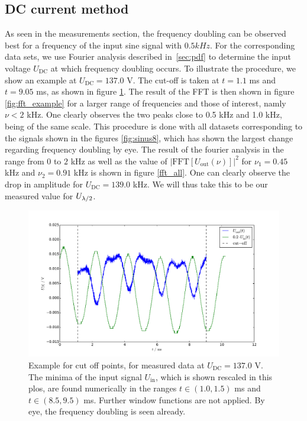 \subsection{DC current method}
\label{ssub:DC current method}
As seen in the measurements section, the frequency doubling can be 
observed best for a frequency of the input sine signal with 
$0.5 kHz$. For the corresponding data sets, we use Fourier analysis 
described in~\ref{sec:pdf} to determine 
the input voltage $U_\mathrm{DC}$ at which frequency doubling occurs. 
To illustrate the procedure, we show an example at $U_\mathrm{DC} = 137.0$ V.
The cut-off is taken at $t = 1.1$ ms and $t = 9.05$ ms, as shown in figure 
\ref{fig:cut_off_example}. The result of the FFT is then shown in figure 
\ref{fig:fft_example} for a larger range of frequencies and those of interest, 
namly $\nu < 2$ kHz. One clearly observes the two peaks close to 
0.5 kHz and 1.0 kHz, being of the same scale. This procedure is 
done with all datasets corresponding to the signals shown in 
the figures \ref{fig:sinus8}, which has shown the largest 
change regarding frequency doubling by eye. The result of the fourier 
analysis in the range from $0$ to $2$ kHz as well as the 
value of $|\mathrm{FFT}\left[U_\mathrm{out} \left(\nu\right)\right]|^2$ for 
$\nu_1 = 0.45$ kHz and $\nu_2 = 0.91$ kHz 
is shown in figure \ref{fft_all}.
One can clearly observe the drop in amplitude for $U_\mathrm{DC} = 139.0$ kHz. 
We will thus take this to be our measured value for $U_{\lambda/2}$.
\begin{figure}
\includegraphics[width=\textwidth]{figures/cut_off_example.pdf}
\caption{
    Example for cut off points, for measured data at 
    $U_\mathrm{DC} = 137.0$ V. The minima of the input 
    signal $U_\mathrm{in}$, which is shown rescaled in this plos, 
    are found numerically in the ranges 
    $t \in (1.0, 1.5)$ ms and $t \in (8.5, 9.5)$ ms. 
    Further window functions are not applied. 
    By eye, the frequency doubling is seen already. 
    }
\label{fig:cut_off_example}
\end{figure}

